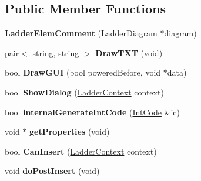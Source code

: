 \subsection*{Public Member Functions}
\begin{DoxyCompactItemize}
\item 
\hypertarget{class_ladder_elem_comment_a9656c1026e7b290febda5fe11154bec9}{{\bfseries Ladder\-Elem\-Comment} (\hyperlink{class_ladder_diagram}{Ladder\-Diagram} $\ast$diagram)}\label{class_ladder_elem_comment_a9656c1026e7b290febda5fe11154bec9}

\item 
\hypertarget{class_ladder_elem_comment_a7b38d0321b8aef5156866497fee5c463}{pair$<$ string, string $>$ {\bfseries Draw\-T\-X\-T} (void)}\label{class_ladder_elem_comment_a7b38d0321b8aef5156866497fee5c463}

\item 
\hypertarget{class_ladder_elem_comment_a62cf33a834d228f74272d20b4911221d}{bool {\bfseries Draw\-G\-U\-I} (bool powered\-Before, void $\ast$data)}\label{class_ladder_elem_comment_a62cf33a834d228f74272d20b4911221d}

\item 
\hypertarget{class_ladder_elem_comment_a8f9a3dbdc2264579adc0c4691a8051fd}{bool {\bfseries Show\-Dialog} (\hyperlink{struct_ladder_context}{Ladder\-Context} context)}\label{class_ladder_elem_comment_a8f9a3dbdc2264579adc0c4691a8051fd}

\item 
\hypertarget{class_ladder_elem_comment_a3b67d265b783b5ab76e82dbfab85baa3}{bool {\bfseries internal\-Generate\-Int\-Code} (\hyperlink{class_int_code}{Int\-Code} \&ic)}\label{class_ladder_elem_comment_a3b67d265b783b5ab76e82dbfab85baa3}

\item 
\hypertarget{class_ladder_elem_comment_a850ae79b96270352e6277c87736e7fba}{void $\ast$ {\bfseries get\-Properties} (void)}\label{class_ladder_elem_comment_a850ae79b96270352e6277c87736e7fba}

\item 
\hypertarget{class_ladder_elem_comment_a70bd9f851e478cdda95ece19cb52a2c6}{bool {\bfseries Can\-Insert} (\hyperlink{struct_ladder_context}{Ladder\-Context} context)}\label{class_ladder_elem_comment_a70bd9f851e478cdda95ece19cb52a2c6}

\item 
\hypertarget{class_ladder_elem_comment_acc8c5d376cb01a0dd4f2a3ea39f0c6f9}{void {\bfseries do\-Post\-Insert} (void)}\label{class_ladder_elem_comment_acc8c5d376cb01a0dd4f2a3ea39f0c6f9}


\end{DoxyCompactItemize}
